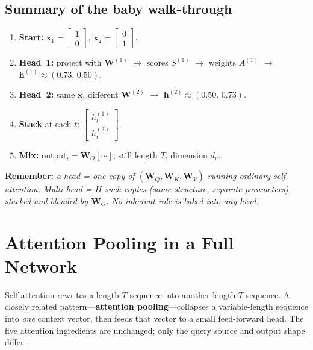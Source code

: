 \documentclass[11pt]{article}
\begin{document}
\subsection{Summary of the baby walk-through}

\begin{enumerate}[leftmargin=*]
  \item \textbf{Start:}
        \(\mathbf{x}_1=\begin{bmatrix}1\\0\end{bmatrix}\),
        \(\mathbf{x}_2=\begin{bmatrix}0\\1\end{bmatrix}\).
  \item \textbf{Head~1:} project with \(\mathbf{W}^{(1)}\) \(\to\)
        scores \(S^{(1)}\) \(\to\) weights \(A^{(1)}\) \(\to\)
        \(\mathbf{h}^{(1)}\approx(0.73,\,0.50)\).
  \item \textbf{Head~2:} same \(\mathbf{x}\), different \(\mathbf{W}^{(2)}\)
        \(\to\) \(\mathbf{h}^{(2)}\approx(0.50,\,0.73)\).
  \item \textbf{Stack} at each \(t\):
        \(\begin{bmatrix}h_t^{(1)}\\h_t^{(2)}\end{bmatrix}\).
  \item \textbf{Mix:} \(\text{output}_t=\mathbf{W}_O[\cdots]\); still
        length \(T\), dimension \(d_v\).
\end{enumerate}

\noindent\textbf{Remember:}
\emph{a head = one copy of \((\mathbf{W}_Q,\mathbf{W}_K,\mathbf{W}_V)\)
running ordinary self-attention. Multi-head = \(H\) such copies (same
structure, separate parameters), stacked and blended by \(\mathbf{W}_O\).
No inherent role is baked into any head.}

\section{Attention Pooling in a Full Network}

Self-attention rewrites a length-\(T\) sequence into another length-\(T\)
sequence. A closely related pattern---\textbf{attention pooling}---collapses
a variable-length sequence into \emph{one} context vector, then feeds that
vector to a small feed-forward head. The five attention ingredients are
unchanged; only the query source and output shape differ.
\end{document}
